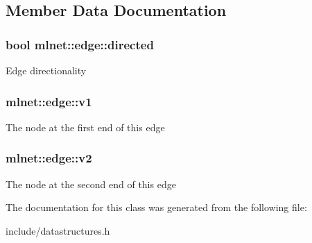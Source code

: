 \subsection{Member Data Documentation}
\hypertarget{classmlnet_1_1edge_a317e58d611d421b7a2472a9b0e47da3b}{
\subsubsection[{directed}]{\setlength{\rightskip}{0pt plus 5cm}bool mlnet\+::edge\+::directed}}\label{classmlnet_1_1edge_a317e58d611d421b7a2472a9b0e47da3b}
Edge directionality \hypertarget{classmlnet_1_1edge_a5937b3d8aaa623600d68c3389e1bcfbc}{
\subsubsection[{v1}]{ mlnet\+::edge\+::v1}}\label{classmlnet_1_1edge_a5937b3d8aaa623600d68c3389e1bcfbc}
The node at the first end of this edge \hypertarget{classmlnet_1_1edge_ac9c3f96b25b4f06cf3d2202e8ea661dc}{
\subsubsection[{v2}]{ mlnet\+::edge\+::v2}}\label{classmlnet_1_1edge_ac9c3f96b25b4f06cf3d2202e8ea661dc}
The node at the second end of this edge 

The documentation for this class was generated from the following file\+:\begin{DoxyCompactItemize}
\item 
include/datastructures.\+h\end{DoxyCompactItemize}
